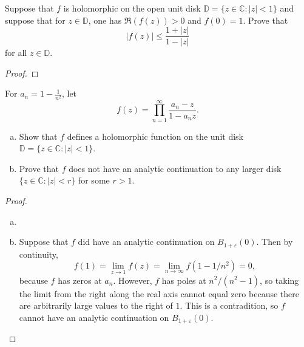 \documentclass{article}
\newenvironment{problem}[2][Problem]{\begin{trivlist}
\item[\hskip \labelsep {\bfseries #1}\hskip \labelsep {\bfseries #2.}]}{\end{trivlist}}
\begin{document}
\begin{problem}{3}
  Suppose that $f$ is holomorphic on the open unit disk
  $\mathbb{D}=\{ z \in \mathbb{C} : |z| < 1 \}$
  and suppose that for $z \in \mathbb{D}$, one has $\mathfrak{R}(f(z)) > 0$ and
  $f(0) = 1$. Prove that \[
    |f(z)| \leq \frac{1 + |z|}{1 - |z|}
  \]  for all $z \in \mathbb{D}$.
\end{problem}

\begin{proof}
\end{proof}

\pagebreak

\begin{problem}{4}
  For $a_n = 1 - \frac{1}{n^2}$, let \[
    f(z) = \prod_{n=1}^\infty \frac{a_n - z}{1 - a_n z}.
  \]
  \begin{enumerate}[(a)]
    \item Show that $f$ defines a holomorphic function on the unit disk
      $\mathbb{D} = \{ z \in \mathbb{C} : |z| < 1 \}$.
    \item Prove that $f$ does not have an analytic continuation to any larger
      disk $\{ z \in \mathbb{C} : |z| < r \}$ for some $r > 1$.
  \end{enumerate}
\end{problem}

\begin{proof} $ $
  \begin{enumerate}[(a)]
    \item
    \item Suppose that $f$ did have an analytic continuation on
      $B_{1 + \varepsilon}(0)$. Then by continuity, \[
        f(1) = \lim_{z \rightarrow 1} f(z) = \lim_{n \rightarrow \infty} f(1 - 1/n^2) = 0,
      \] because $f$ has zeros at $a_n$.
      However, $f$ has poles at $n^2/(n^2 - 1)$, so taking the limit from the
      right along the real axis cannot equal zero because there are arbitrarily
      large values to the right of $1$. This is a contradition, so $f$ cannot
      have an analytic continuation on $B_{1+\varepsilon}(0)$.
  \end{enumerate}
\end{proof}
\end{document}
